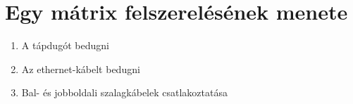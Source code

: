 \chapter{Egy mátrix felszerelésének menete}

\begin{enumerate}	
	\item A tápdugót bedugni
	\item Az ethernet-kábelt bedugni
	\item Bal- és jobboldali szalagkábelek csatlakoztatása
\end{enumerate}